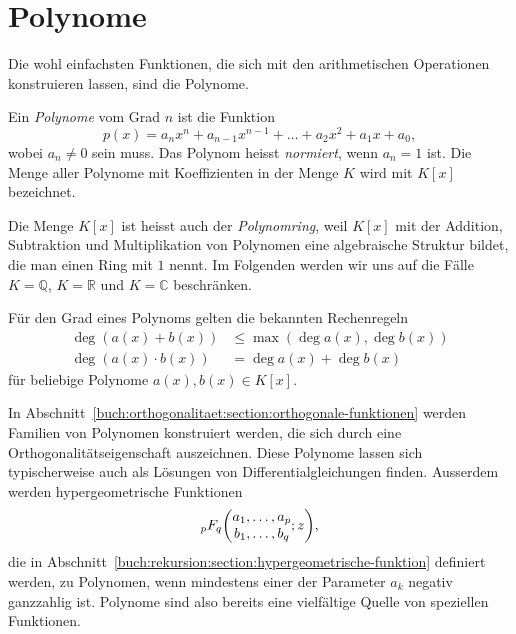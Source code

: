 %
%
%
\section{Polynome
\label{buch:potenzen:section:polynome}}
Die wohl einfachsten Funktionen, die sich mit den arithmetischen
Operationen konstruieren lassen, sind die Polynome.

\begin{definition}
%
Ein {\em Polynome} vom Grad $n$ ist die Funktion
\[
p(x) = a_nx^n + a_{n-1}x^{n-1} + \dots + a_2x^2 + a_1x + a_0,
\]
wobei $a_n\ne 0$ sein muss.
Das Polynom heisst {\em normiert}, wenn $a_n=1$ ist.
%
%
Die Menge aller Polynome mit Koeffizienten in der Menge $K$ wird mit
$K[x]$ bezeichnet.
\end{definition}

Die Menge $K[x]$ ist heisst auch der {\em Polynomring}, weil $K[x]$
%
mit der Addition, Subtraktion und Multiplikation von Polynomen eine
algebraische Struktur bildet, die man einen Ring mit $1$ nennt.
%
Im Folgenden werden wir uns auf die Fälle $K=\mathbb{Q}$, $K=\mathbb{R}$
und $K=\mathbb{C}$ beschränken.

Für den Grad eines Polynoms gelten die bekannten Rechenregeln
\begin{align*}
\deg (a(x) + b(x)) &\le \operatorname{max}(\deg a(x), \deg b(x))
\\
\deg (a(x)\cdot b(x)) &=\deg a(x) + \deg b(x)
\end{align*}
für beliebige Polynome $a(x),b(x)\in K[x]$.

In Abschnitt~\ref{buch:orthogonalitaet:section:orthogonale-funktionen} werden
Familien von Polynomen konstruiert werden, die sich durch eine
Orthogonalitätseigenschaft auszeichnen.
Diese Polynome lassen sich typischerweise auch als Lösungen von
Differentialgleichungen finden.
Ausserdem werden hypergeometrische Funktionen
\[
\mathstrut_pF_q\biggl(
\begin{matrix}a_1,\dots,a_p\\b_1,\dots,b_q\end{matrix};z
\biggr),
\] die in
Abschnitt~\ref{buch:rekursion:section:hypergeometrische-funktion}
definiert werden, zu Polynomen, wenn mindestens einer der
Parameter $a_k$ negativ ganzzahlig ist.
Polynome sind also bereits eine vielfältige Quelle von speziellen
Funktionen.

